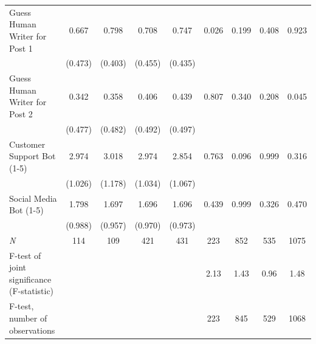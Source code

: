 \begin{tabular}{l*{8}{c}}
Guess Human Writer for Post 1&    0.667&    0.798&    0.708&    0.747&    0.026&    0.199&    0.408&    0.923\\
                &  (0.473)&  (0.403)&  (0.455)&  (0.435)&         &         &         &         \\
Guess Human Writer for Post 2&    0.342&    0.358&    0.406&    0.439&    0.807&    0.340&    0.208&    0.045\\
                &  (0.477)&  (0.482)&  (0.492)&  (0.497)&         &         &         &         \\
Customer Support Bot (1-5)&    2.974&    3.018&    2.974&    2.854&    0.763&    0.096&    0.999&    0.316\\
                &  (1.026)&  (1.178)&  (1.034)&  (1.067)&         &         &         &         \\
Social Media Bot (1-5)&    1.798&    1.697&    1.696&    1.696&    0.439&    0.999&    0.326&    0.470\\
                &  (0.988)&  (0.957)&  (0.970)&  (0.973)&         &         &         &         \\
\textit{N} & 114 & 109 & 421 & 431
& 223 & 852 & 535 & 1075 \\
\midrule
F-test of joint significance (F-statistic)
& & & &
& 2.13 & 1.43 & 0.96 & 1.48 \\
F-test, number of observations
& & & &
& 223 & 845 & 529 & 1068 \\
\hline\hline
\end{tabular}
